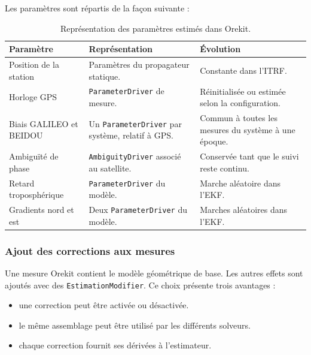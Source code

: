 Les paramètres sont répartis de la façon suivante :

\begin{table}[htbp]
\centering
\small
\begin{tabularx}{\textwidth}{|>{\raggedright\arraybackslash}p{}|
                                  >{\raggedright\arraybackslash}p{}|
                                  >{\raggedright\arraybackslash}X|}
\hline
\textbf{Paramètre} & \textbf{Représentation} & \textbf{Évolution} \\
\hline
Position de la station & Paramètres du propagateur statique. & Constante dans
l'ITRF. \\
\hline
Horloge GPS & \texttt{ParameterDriver} de mesure. & Réinitialisée ou estimée
selon la configuration. \\
\hline
Biais GALILEO et BEIDOU & Un \texttt{ParameterDriver} par système, relatif à
GPS. & Commun à toutes les mesures du système à une époque. \\
\hline
Ambiguïté de phase & \texttt{AmbiguityDriver} associé au satellite. & Conservée
tant que le suivi reste continu. \\
\hline
Retard troposphérique & \texttt{ParameterDriver} du modèle. & Marche aléatoire
dans l'EKF. \\
\hline
Gradients nord et est & Deux \texttt{ParameterDriver} du modèle. & Marches
aléatoires dans l'EKF. \\
\hline
\end{tabularx}
\caption{Représentation des paramètres estimés dans Orekit.}
\label{tab:orekit_parameter_mapping}
\end{table}

\subsubsection{Ajout des corrections aux mesures}

Une mesure Orekit contient le modèle géométrique de base. Les autres effets
sont ajoutés avec des \texttt{EstimationModifier}. Ce choix présente trois
avantages :

\begin{itemize}
    \item une correction peut être activée ou désactivée.
    \item le même assemblage peut être utilisé par les différents solveurs.
    \item chaque correction fournit ses dérivées à l'estimateur.
\end{itemize}

